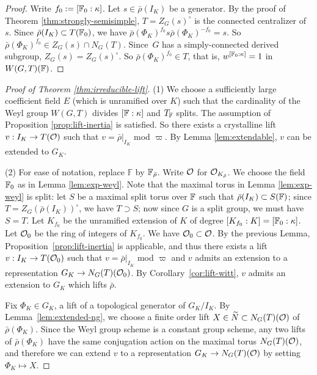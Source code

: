 \documentclass[10pt,a4paper,twoside]{article}
\begin{document}
\begin{proof}
Write $f_0 := [{\mathbb{F}}_0:\kappa]$.
Let $s\in \bar\rho(I_K)$ be a generator.
By the proof of Theorem \ref{thm:strongly-semisimple},
$T = Z_G(s)^{\circ}$ is the connected centralizer of $s$.
Since $\bar\rho(I_K) \subset T({\mathbb{F}}_0)$,
we have $\bar\rho(\Phi_K)^{f_0}s\bar\rho(\Phi_K)^{-f_0} = s$.
So $\bar\rho(\Phi_K)^{f_0} \in Z_G(s) \cap N_G(T)$.
Since~$G$ has a simply-connected derived subgroup,
$Z_G(s) = Z_G(s)^\circ$.
So $\bar\rho(\Phi_K)^{f_0} \in T$, that is,
$w^{[{\mathbb{F}}_0:\kappa]}=1$ in $W(G,T)({\mathbb{F}})$.
\end{proof}


\begin{proof} [Proof of Theorem \ref{thm:irreducible-lift}]
(1)
We choose a sufficiently large coefficient field $E$ (which is unramified over $K$) such that the cardinality of the Weyl group $W(G,T)$ divides $[{\mathbb{F}}:\kappa]$ and $T_{{\mathbb{F}}}$ splits. 
The assumption of Proposition \ref{prop:lift-inertia} is satisfied.
So there exists a crystalline lift 
$v: I_K \to T(\mathcal{O})$ such that $v = \bar\rho|_{I_K}$ mod $\varpi$.
By Lemma \ref{lem:extendable}, $v$ can be extended to $G_K$.


(2)
For ease of notation, replace $\mathbb{F}$
by ${\mathbb{F}}_{\bar\rho}$.
Write $\mathcal{O}$ for $\mathcal{O}_{K_{\bar\rho}}$.
We choose the field ${\mathbb{F}}_0$ as in Lemma \ref{lem:exp-weyl}.
Note that the maximal torus in Lemma \ref{lem:exp-weyl} is split:
let $S$ be a maximal split torus over ${\mathbb{F}}$
such that $\bar\rho(I_K)\subset S({\mathbb{F}})$;
since $T=Z_G(\bar\rho(I_K))^\circ$, we have
$T \supset S$; now since $G$ is a split group, we must have $S=T$.
Let $K_{f_0}$ be the unramified extension of $K$ of degree $[K_{f_0}:K]=[{\mathbb{F}}_0:\kappa]$.
Let $\mathcal{O}_0$ be the ring of integers of $K_{f_0}$.
We have $\mathcal{O}_0\subset \mathcal{O}$.
By the previous Lemma, 
Proposition~\ref{prop:lift-inertia} is applicable, and thus
there exists a lift $v:I_K \to T(\mathcal{O}_0)$ such that $v = \bar\rho|_{I_K}$ mod $\varpi$
and $v$ admits an extension to a representation $G_K \to N_G(T)(\mathcal{O}_0)$.
By Corollary~\ref{cor:lift-witt},
$v$ admits an extension to $G_K$ which lifts $\bar\rho$.

Fix $\Phi_K \in G_K$, a lift of a topological generator of $G_K/I_K$.
By Lemma~\ref{lem:extended-ng}, we choose a finite order lift
$X\in \widetilde{N}\subset N_G(T)(\mathcal{O})$ of $\bar\rho(\Phi_K)$.
Since the Weyl group scheme is a constant group scheme,
any two lifts of $\bar\rho(\Phi_K)$ have the same conjugation action on the
maximal torus $N_G(T)(\mathcal{O})$, and therefore
we can extend $v$ to a representation $G_K \to N_G(T)(\mathcal{O})$ by setting $\Phi_K \mapsto X$.
\end{proof}
\end{document}
